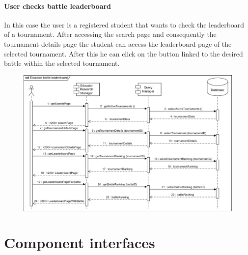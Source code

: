 \documentclass[12pt, a4paper]{report}
\begin{document}
    \paragraph*{User checks battle leaderboard}
    In this case the user is a registered student that wants to check the leaderboard of a tournament. 
    After accessing the search page and consequently the tournament details page the student can access the leaderboard page of the selected tournament. 
    After this he can click on the button linked to the desired battle within the selected tournament. 
    \begin{figure}[H]
        \centering
        \includegraphics[width=1.0\linewidth]{images/eblrv.png}
    \end{figure}







































    \section{Component interfaces}
\end{document}
